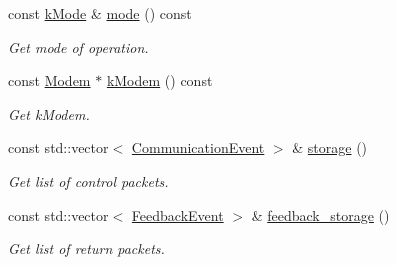\begin{DoxyCompactItemize}
const \hyperlink{classosse_1_1collaborate_1_1_subsystem_comm_a5e1ce4f232ca2aae0b99d1225e682190}{k\+Mode} \& \hyperlink{classosse_1_1collaborate_1_1_subsystem_comm_adaba2e0c3b3704a4ece62137d609adff}{mode} () const
\begin{DoxyCompactList}\small\item\em Get mode of operation. \end{DoxyCompactList}\item 
const \hyperlink{classosse_1_1collaborate_1_1_modem}{Modem} $\ast$ \hyperlink{classosse_1_1collaborate_1_1_subsystem_comm_a8c5aa0a02bc95da7ad3cbd6063d0ed61}{k\+Modem} () const
\begin{DoxyCompactList}\small\item\em Get k\+Modem. \end{DoxyCompactList}\item 
const std\+::vector$<$ \hyperlink{structosse_1_1collaborate_1_1_subsystem_comm_1_1_communication_event}{Communication\+Event} $>$ \& \hyperlink{classosse_1_1collaborate_1_1_subsystem_comm_a9c9e0f1c881dd90275186b5146236849}{storage} ()
\begin{DoxyCompactList}\small\item\em Get list of control packets. \end{DoxyCompactList}\item 
const std\+::vector$<$ \hyperlink{structosse_1_1collaborate_1_1_subsystem_comm_1_1_feedback_event}{Feedback\+Event} $>$ \& \hyperlink{classosse_1_1collaborate_1_1_subsystem_comm_a99c728f5a45dc285197f5cd68708cb14}{feedback\+\_\+storage} ()
\begin{DoxyCompactList}\small\item\em Get list of return packets. \end{DoxyCompactList}\end{DoxyCompactItemize}
